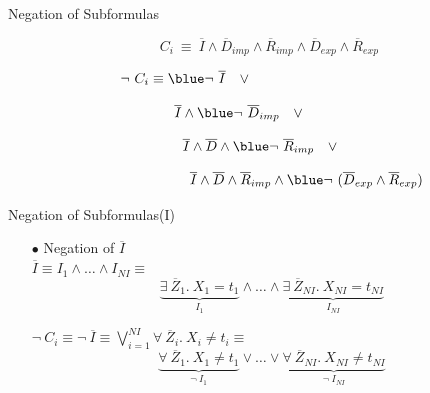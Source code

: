 \documentclass[pdf,slideColor,contemporain]{prosper}
\begin{document}
\begin{slide}{Negation of Subformulas}
\vspace{-0.3cm}

\[ ~~~~~~C_i~ \equiv ~\overline{I} \wedge \overline{D}_{imp}  \wedge
\overline{R}_{imp} \wedge  \overline{D}_{exp} \wedge  \overline{R}_{exp} \]


\[  \neg ~ C_i \equiv {\blue \neg~ \overline{I} }~~~ \vee  ~~~~~~~~~~~~~~~~~~~~~~~~~~~~~~~~\]

\[  \overline{I} \wedge {\blue \neg~ \overline{D}_{imp}}  ~~~ \vee  ~~~~~~~~~ \]

\[  \overline{I} \wedge \overline{D} \wedge {\blue \neg~ \overline{R}_{imp} } ~~~ \vee  \]

\[  ~~~~~~~~~~~~~~~~~~~~ \overline{I} \wedge \overline{D} \wedge
\overline{R}_{imp}  \wedge {\blue \neg~ (\overline{D}_{exp} \wedge \overline{R}_{exp}) }  \]

 
\end{slide}

\begin{slide}{Negation of Subformulas(I)}
     \begin{itemize}
        \item[{\blue$\bullet$}] Negation of $\overline{I}$ \\
\vspace{0.5cm}
$\overline{I} \equiv I_1 \wedge \ldots \wedge I_{NI} \equiv$
\[ \underbrace{\exists~ \overline{Z}_1.~ X_1 = t_1 } _{I_1} \wedge \ldots \wedge   \underbrace{\exists~ \overline{Z}_{NI}.~ X_{NI} = t_{NI} } _{I_{NI}} \]
{\blue

$ \neg ~ C_i \equiv \neg~ \overline{I} \equiv \bigvee_{i=1}^{NI} \forall~ \overline{Z}_i.~ X_i
           \neq t_i \equiv $
\[ \underbrace{\forall~ \overline{Z}_1.~ X_1 \neq t_1} _{\neg~
           I_1} \vee \ldots \vee \underbrace{\forall~
           \overline{Z}_{NI}.~ X_{NI} \neq t_{NI} } _{\neg~ I_{NI}} \] 
}
     \end{itemize}
\end{slide}
\end{document}
